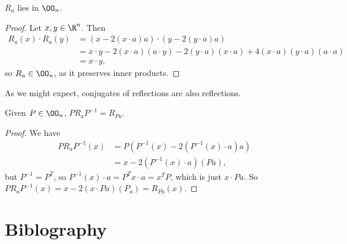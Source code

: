 \documentclass[a4]{scrreprt}
\begin{document}
\begin{definition}
\begin{center}

	\end{center}
\end{definition}

\begin{lemma}
	$R_a$ lies in $\OO_n$.
\end{lemma}
\begin{proof}
	Let $x, y \in \R^n$. Then
	\begin{align*}
		R_a(x) \cdot R_a(y) &= (x - 2(x \cdot a)a) \cdot (y - 2(y \cdot a)a) \\
		&= x \cdot y - 2(x \cdot a)(a \cdot y) - 2(y \cdot a)(x \cdot a) + 4(x \cdot a)(y \cdot a)(a \cdot a)\\
		&= x \cdot y,
	\end{align*}
	so $R_a \in \OO_n$, as it preserves inner products.
\end{proof}

As we might expect, conjugates of reflections are also reflections.

\begin{lemma}
	Given $P \in \OO_n$, $P R_a P^{-1} = R_{Pa}$.
\end{lemma}
\begin{proof}
	We have
	\begin{align*}
		P R_a P^{-1}(x) &= P(P^{-1}(x) - 2(P^{-1}(x) \cdot a)a) \\
		&= x - 2(P^{-1}(x) \cdot a)(P a),
	\end{align*}
	but $P^{-1} = P^T$, so $P^{-1}(x)\cdot a = P^T x \cdot a = x^T P$, which is just $x \cdot Pa$. So $P R_a P^{-1}(x) = x - 2(x\cdot Pa)(P_a) = R_{Pa}(x)$.
\end{proof}




\clearpage
\chapter*{Biblography}
\end{document}
